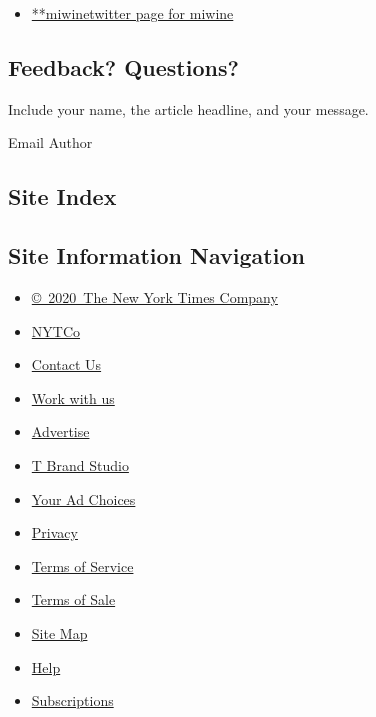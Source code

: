 \begin{itemize}
\tightlist
\item
  \href{https://twitter.com/miwine}{**miwinetwitter page for miwine}
\end{itemize}

\hypertarget{feedback-questions}{%
\subsection{Feedback? Questions?}\label{feedback-questions}}

Include your name, the article headline, and your message.

Email Author

\hypertarget{site-index}{%
\subsection{Site Index}\label{site-index}}

\hypertarget{site-information-navigation}{%
\subsection{Site Information
Navigation}\label{site-information-navigation}}

\begin{itemize}
\tightlist
\item
  \href{https://help.nytimes3xbfgragh.onion/hc/en-us/articles/115014792127-Copyright-notice}{©~2020~The
  New York Times Company}
\end{itemize}

\begin{itemize}
\tightlist
\item
  \href{https://www.nytco.com/}{NYTCo}
\item
  \href{https://help.nytimes3xbfgragh.onion/hc/en-us/articles/115015385887-Contact-Us}{Contact
  Us}
\item
  \href{https://www.nytco.com/careers/}{Work with us}
\item
  \href{https://nytmediakit.com/}{Advertise}
\item
  \href{http://www.tbrandstudio.com/}{T Brand Studio}
\item
  \href{https://www.nytimes3xbfgragh.onion/privacy/cookie-policy\#how-do-i-manage-trackers}{Your
  Ad Choices}
\item
  \href{https://www.nytimes3xbfgragh.onion/privacy}{Privacy}
\item
  \href{https://help.nytimes3xbfgragh.onion/hc/en-us/articles/115014893428-Terms-of-service}{Terms
  of Service}
\item
  \href{https://help.nytimes3xbfgragh.onion/hc/en-us/articles/115014893968-Terms-of-sale}{Terms
  of Sale}
\item
  \href{https://spiderbites.nytimes3xbfgragh.onion}{Site Map}
\item
  \href{https://help.nytimes3xbfgragh.onion/hc/en-us}{Help}
\item
  \href{https://www.nytimes3xbfgragh.onion/subscription?campaignId=37WXW}{Subscriptions}
\end{itemize}

